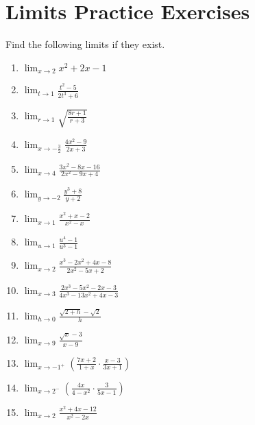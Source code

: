 \documentclass{book}
\begin{document}
\vspace{0.3cm}

\section{Limits Practice Exercises}

Find the following limits if they exist.
\vspace{0.2cm}

\begin{enumerate}
    \item $\displaystyle \lim_{x \to 2} x^2 + 2x - 1$
    \item $\displaystyle \lim_{t \to 1} \frac{t^2 - 5}{2t^3 + 6}$
    \item $\displaystyle \lim_{r \to 1} \sqrt{\frac{8r + 1}{r + 3}}$
    \item $\displaystyle \lim_{x \to -\frac{3}{2}} \frac{4x^2 - 9}{2x + 3}$
    \item $\displaystyle \lim_{x \to 4} \frac{3x^2 - 8x - 16}{2x^2 - 9x + 4}$
    \item $\displaystyle \lim_{y \to -2} \frac{y^3 + 8}{y + 2}$
    \item $\displaystyle \lim_{x \to 1} \frac{x^2 + x - 2}{x^2 - x}$
    \item $\displaystyle \lim_{u \to 1} \frac{u^4 - 1}{u^3 - 1}$
    \item $\displaystyle \lim_{x \to 2} \frac{x^3 - 2x^2 + 4x - 8}{2x^2 - 5x + 2}$
    \item $\displaystyle \lim_{x \to 3} \frac{2x^3 - 5x^2 - 2x - 3}{4x^3 - 13x^2 + 4x - 3}$
    \item $\displaystyle \lim_{h \to 0} \frac{\sqrt{2 + h} - \sqrt{2}}{h}$
    \item $\displaystyle \lim_{x \to 9} \frac{\sqrt{x} - 3}{x - 9}$
    \item $\displaystyle \lim_{x \to -1^+} \left( \frac{7x + 2}{1 + x} \cdot \frac{x - 3}{3x + 1} \right)$
    \item $\displaystyle \lim_{x \to 2^-} \left( \frac{4x}{4 - x^2} \cdot \frac{3}{5x - 1} \right)$
    
    \item $\displaystyle \lim_{x \to 2} \frac{x^2 + 4x - 12}{x^2 - 2x}$


\end{enumerate}
\end{document}
